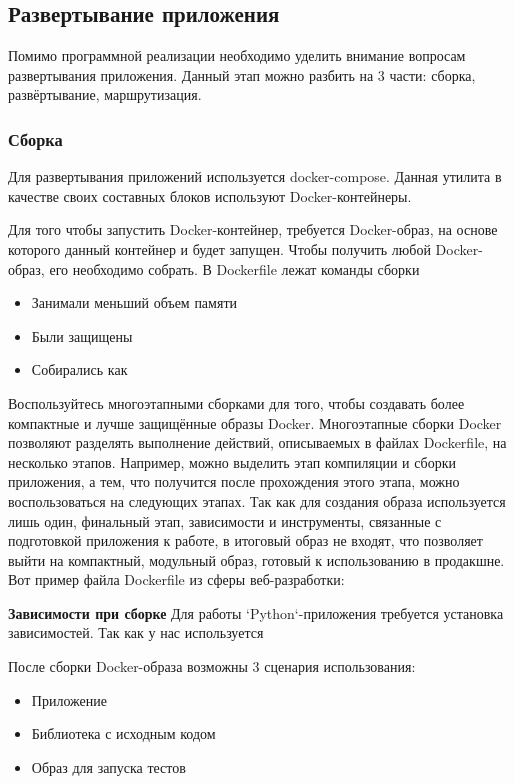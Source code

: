 \subsection{\large{Развертывание приложения}}

Помимо программной реализации необходимо уделить внимание вопросам развертывания приложения.
Данный этап можно разбить на 3 части: сборка, развёртывание, маршрутизация.

\subsubsection{\large{Сборка}}


Для развертывания приложений используется docker-compose.
Данная утилита в качестве своих составных блоков используют Docker-контейнеры.

Для того чтобы запустить Docker-контейнер, требуется Docker-образ, на основе которого данный контейнер и будет
запущен.
Чтобы получить любой Docker-образ, его необходимо собрать. В Dockerfile лежат команды сборки


\begin{itemize}
    \item Занимали меньший объем памяти
    \item Были защищены
    \item Собирались как
\end{itemize}

Воспользуйтесь многоэтапными сборками для того, чтобы создавать более компактные и лучше защищённые образы Docker.
Многоэтапные сборки Docker позволяют разделять выполнение действий, описываемых в файлах Dockerfile, на несколько этапов. Например, можно выделить этап компиляции и сборки приложения, а тем, что получится после прохождения этого этапа, можно воспользоваться на следующих этапах. Так как для создания образа используется лишь один, финальный этап, зависимости и инструменты, связанные с подготовкой приложения к работе, в итоговый образ не входят, что позволяет выйти на компактный, модульный образ, готовый к использованию в продакшне.
Вот пример файла Dockerfile из сферы веб-разработки:

\textbf{Зависимости при сборке}
Для работы `Python`-приложения требуется установка зависимостей.
Так как у нас используется

После сборки Docker-образа возможны 3 сценария использования:
\begin{itemize}
    \item Приложение
    \item Библиотека с исходным кодом
    \item Образ для запуска тестов
\end{itemize}

